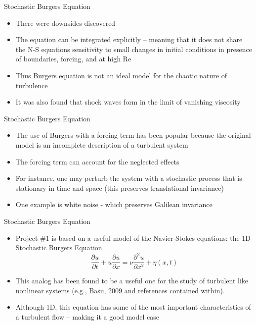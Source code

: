 \begin{frame}{Stochastic Burgers Equation}
\begin{itemize}
	\item There were downsides discovered
	\item The equation can be integrated explicitly -- meaning that it does not share the N-S equations sensitivity to small changes in initial conditions in presence of boundaries, forcing, and at high Re
	\item Thus Burgers equation is not an ideal model for the chaotic nature of turbulence
	\item It was also found that shock waves form in the limit of vanishing viscosity
	\end{itemize}
\end{frame}

\begin{frame}{Stochastic Burgers Equation}
\begin{itemize}
	\item The use of Burgers with a forcing term has been popular because the original model is an incomplete description of a turbulent system
	\item The forcing term can account for the neglected effects
	\item For instance, one may perturb the system with a stochastic process that is stationary in time and space (this preserves translational invariance)
	\item One example is white noise - which preserves Galilean invariance 
	\end{itemize}
\end{frame}


\begin{frame}{Stochastic Burgers Equation}
\begin{itemize}
	\item Project \#1 is based on a useful model of the Navier-Stokes equations: the 1D Stochastic Burgers Equation
	$$\frac{\partial u}{\partial t} + u\frac{\partial u}{\partial x} = \nu \frac{\partial^2 u}{\partial x^2} + \eta(x,t)$$
	\item This analog has been found to be a useful one for the study of turbulent like nonlinear systems (e.g., Basu, 2009 and references contained within).
	\item Although 1D, this equation has some of the most important characteristics of a turbulent flow -- making it a good model case
\end{itemize}

\end{frame}

